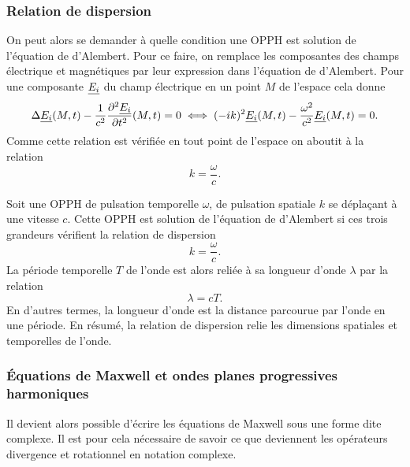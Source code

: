 \subsubsection{Relation de dispersion}
On peut alors se demander à quelle condition une OPPH est solution de l'équation de
d'Alembert.
Pour ce faire, on remplace les composantes des champs électrique et magnétiques 
par leur expression dans l'équation de d'Alembert. Pour une composante 
$\underline{E_i}$ du champ électrique en un point $M$ de l'espace cela donne
\begin{equation*}
	\Delta \underline{E_i}(M, t) -\dfrac{1}{c^2} \dfrac{\partial ^2\underline{E_i}}{\partial t^2}(M, t) = 0
	\iff (-ik)^2 \underline{E_i}(M, t) - \dfrac{\omega^2}{c^2} 
	\underline{E_i}(M, t) = 0.
\end{equation*}
Comme cette relation est vérifiée en tout point de l'espace on aboutit à la relation
\begin{equation*}
	\boxed{
	k = \frac{\omega}{c}.
	      }
\end{equation*}

\begin{defn}
	Soit une OPPH de pulsation temporelle $\omega$, de pulsation 
	spatiale $k$ se déplaçant à une vitesse $c$. Cette OPPH est solution
	de l'équation de d'Alembert si ces trois grandeurs vérifient la
	relation de dispersion
	\begin{equation}
		k = \dfrac{\omega}{c}.
	\end{equation}
	La période temporelle $T$ de l'onde est alors reliée à sa longueur d'onde
	$\lambda$ par la relation 
	\begin{equation}
		\lambda = c T.
	\end{equation}
	En d'autres termes, la longueur d'onde est la distance parcourue par l'onde
	en une période. En résumé, la relation de dispersion relie les 
	dimensions spatiales et temporelles de l'onde.
\end{defn}

\subsubsection{Équations de Maxwell et ondes planes progressives harmoniques}
Il devient alors possible d'écrire les équations de Maxwell sous une forme
dite complexe. Il est pour cela nécessaire de savoir ce que deviennent 
les opérateurs divergence et rotationnel en notation complexe. 

